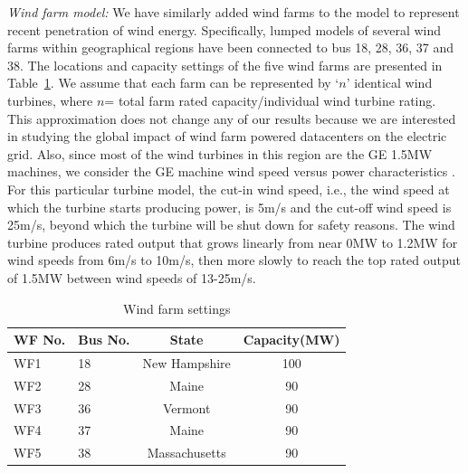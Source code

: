 {\em Wind farm model:}  We have similarly added wind farms to the model to represent recent penetration of wind energy.  Specifically, lumped models of several wind farms within geographical regions have been connected to bus 18, 28, 36, 37 and 38. The locations and capacity settings of the five wind farms are presented in Table~\ref{tab:wf_setting}. We assume that each farm can be represented by `$n$' identical wind turbines, where $n$= total farm rated capacity/individual wind turbine rating. This approximation does not change any of our results because we are interested in studying the global impact of wind farm powered datacenters on the electric grid. Also, since most of the wind turbines in this region are the GE 1.5MW machines, we consider the GE machine wind speed versus power characteristics \cite{lei2006modeling}.  For this particular turbine model, the cut-in wind speed, i.e., the wind speed at which the turbine starts producing power, is 5m/s and the cut-off wind speed is 25m/s, beyond which the turbine will be shut down for safety reasons. The wind turbine produces rated output that grows linearly from near 0MW to 1.2MW for wind speeds from 6m/s to 10m/s, then more slowly to reach the top rated output of
1.5MW between wind speeds of 13-25m/s.



\begin{table}[ht]
\begin{center}
\caption{Wind farm settings}
\begin{tabular}{|l|l|c|c|}
\hline
WF No. & Bus No. & State & Capacity(MW) \\
\hline
WF1 & 18& New Hampshire & 100\\
WF2 & 28& Maine & 90 \\
WF3 & 36& Vermont & 90  \\
WF4 & 37& Maine & 90\\
WF5 & 38& Massachusetts & 90\\
\hline

\end{tabular}
   \vspace{.05in}
\label{tab:wf_setting}
\end{center}
\end{table}

